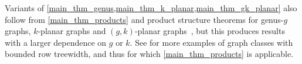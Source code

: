 \documentclass{patmorin}
\newcommand{\defin}[1]{\emph{\textcolor{brightmaroon}{#1}}}
\begin{document}
Variants of \cref{main_thm_genus,main_thm_k_planar,main_thm_gk_planar} also follow from \cref{main_thm_products} and product structure theorems for genus-$g$ graphs, $k$-planar graphs and $(g,k)$-planar graphs~\cite{dujmovic.joret.ea:planar,distel.hickingbotham.ea:improved,dujmovic.morin.ea:graph,distel.hickingbotham.ea:powers}, but this produces results with a larger dependence on $g$ or $k$. See \citep{HW24} for more examples of graph classes with bounded row treewidth, and thus for which \cref{main_thm_products} is applicable. 


%
%
%
\end{document}

